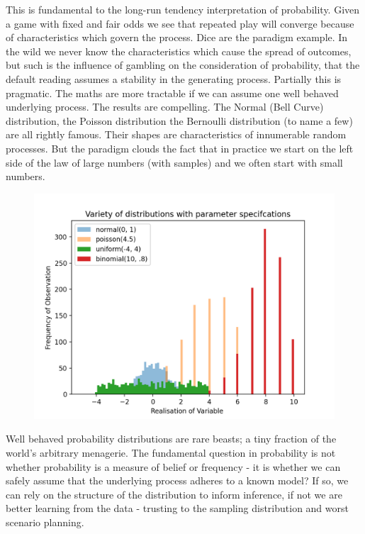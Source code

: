 \documentclass[10pt,a4paper,notitlepage, twocolumn]{article}
\begin{document}
\noindent This is fundamental to the long-run tendency interpretation of probability. Given a game with fixed and fair odds we see that repeated play will converge because of characteristics which govern the process. Dice are the paradigm example.  In the wild we never know the characteristics which cause the spread of outcomes, but such is the influence of gambling on the consideration of probability, that the default reading assumes a stability in the generating process. Partially this is pragmatic. The maths are more tractable if we can assume one well behaved underlying process. The results are compelling. The Normal (Bell Curve) distribution, the Poisson distribution the Bernoulli distribution (to name a few) are all rightly famous. Their shapes are characteristics of innumerable random processes. But the paradigm clouds the fact that in practice we start on the left side of the law of large numbers (with samples) and we often start with small numbers. 
\begin{figure}[H]
  \includegraphics[width=\linewidth]{./Plots/variety_of_distributions.png}
\end{figure}
Well behaved probability distributions are rare beasts; a tiny fraction of the world's arbitrary menagerie. The fundamental question in probability is not whether probability is a measure of belief or frequency - it is whether we can safely assume that the underlying process adheres to a known model? If so, we can rely on the structure of the distribution to inform inference, if not we are better learning from the data - trusting to the sampling distribution and worst scenario planning.
\end{document}
